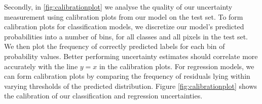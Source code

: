 Secondly, in \cref{fig:calibrationplot} we analyse the quality of our uncertainty measurement using calibration plots from our model on the test set. To form calibration plots for classification models, we discretize our model’s predicted probabilities into a number of bins, for all classes and all pixels in the test set. We then plot the frequency of correctly predicted labels for each bin of probability values. Better performing uncertainty estimates should correlate more accurately with the line $y=x$ in the calibration plots. For regression models, we can form calibration plots by comparing the frequency of residuals lying within varying thresholds of the predicted distribution. Figure \ref{fig:calibrationplot} shows the calibration of our classification and regression uncertainties.




